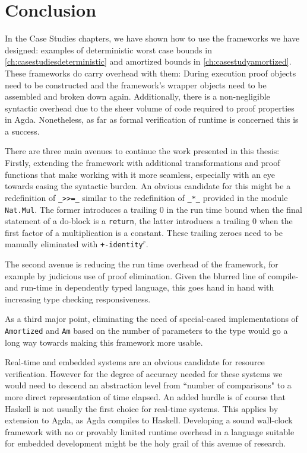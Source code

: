 
\chapter{Conclusion}
In the Case Studies chapters, we have shown how to use the frameworks we have designed: examples of deterministic worst case bounds in \autoref{ch:casestudiesdeterministic} and amortized bounds in \autoref{ch:casestudyamortized}. These frameworks do carry overhead with them: During execution proof objects need to be constructed and the framework's wrapper objects need to be assembled and broken down again. Additionally, there is a non-negligible syntactic overhead due to the sheer volume of code required to proof properties in Agda. Nonetheless, as far as formal verification of runtime is concerned this is a success.

There are three main avenues to continue the work presented in this thesis: Firstly, extending the framework with additional transformations and proof functions that make working with it more seamless, especially with an eye towards easing the syntactic burden. An obvious candidate for this might be a redefinition of \texttt{\_>>=\_} similar to the redefinition of \texttt{\_*\_} provided in the module \texttt{Nat.Mul}. The former introduces a trailing $0$ in the run time bound when the final statement of a do-block is a \texttt{return}, the latter introduces a trailing $0$ when the first factor of a multiplication is a constant. These trailing zeroes need to be manually eliminated with \texttt{+-identity$^r$}.

The second avenue is reducing the run time overhead of the framework, for example by judicious use of proof elimination. Given the blurred line of compile- and run-time in dependently typed language, this goes hand in hand with increasing type checking responsiveness.

As a third major point, eliminating the need of special-cased implementations of \texttt{Amortized} and \texttt{Am} based on the number of parameters to the type would go a long way towards making this framework more usable.

Real-time and embedded systems are an obvious candidate for resource verification. However for the degree of accuracy needed for these systems we would need to descend an abstraction level from ``number of comparisons" to a more direct representation of time elapsed. An added hurdle is of course that Haskell is not usually the first choice for real-time systems. This applies by extension to Agda, as Agda compiles to Haskell. Developing a sound wall-clock framework with no or provably limited runtime overhead in a language suitable for embedded development might be the holy grail of this avenue of research.

